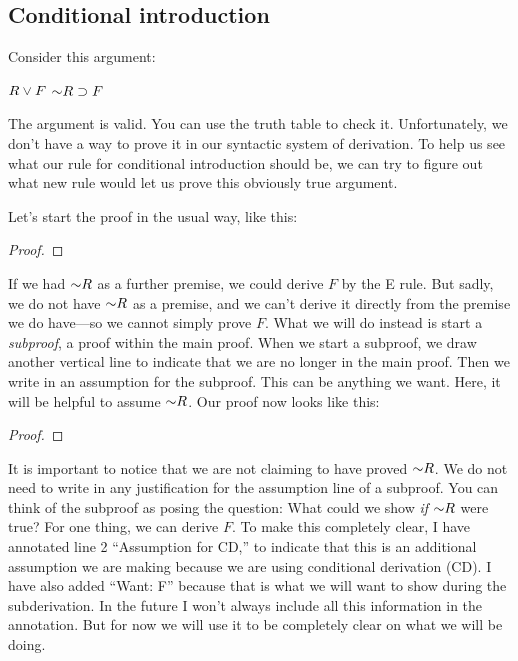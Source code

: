 \subsection{Conditional introduction}
Consider this argument:
\begin{earg*}
\item $R \vee F$
\itemc[.15] $\mathord{\sim} R \supset F$
\end{earg*}
The argument is valid. You can use the truth table to check it. Unfortunately, we don't have a way to prove it in our syntactic system of derivation. To help us see what our rule for 
conditional introduction should be, we can try to figure out what new rule would let us prove this obviously true argument.

Let's start the proof in the usual way, like this:

\begin{proof}
	 
\end{proof}

If we had $\mathord{\sim} R$ as a further premise, we could derive $F$ by the {\eor}E rule. But sadly, we do not have $\mathord{\sim} R$ as a premise, and we can't derive it directly from the premise we do have---so we cannot simply prove $F$. What we will do instead is start a \emph{subproof}, a proof within the main proof. When we start a subproof, we draw another vertical line to indicate that we are no longer in the main proof. Then we write in an assumption for the subproof. This can be anything we want. Here, it will be helpful to assume $\mathord{\sim} R$. Our proof now looks like this:

\begin{proof}
	\open
	\close
\end{proof}

It is important to notice that we are not claiming to have proved $\mathord{\sim} R$. We do not need to write in any justification for the assumption line of a subproof. You can think of the subproof as posing the question: What could we show \emph{if} $\mathord{\sim} R$ were true? For one thing, we can derive $F$. To make this completely clear, I have annotated line 2 ``Assumption for CD,'' to indicate that this is an additional assumption we are making because we are using conditional derivation (CD). I have also added ``Want: F'' because that is what we will want to show during the subderivation. In the future I won't always include all this information in the annotation. But for now we will use it to be completely clear on what we will be doing.

